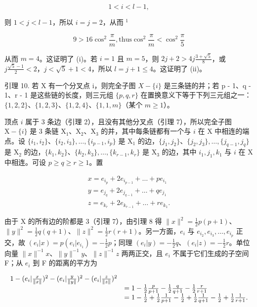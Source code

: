 \[
1 <   i <   l - 1,
\]

则 \(1 < j < l - 1\)，所以 \(i = j = 2\)，从而 \({}^1\)

\[
9 > 16 \cos^ {2} {\frac {\pi}{m}}, \text {thus} \cos^ {2} {\frac {\pi}{m}} <   \cos^ {2} {\frac {\pi}{5}}
\]

从而 \(m = 4\)。这证明了 (i)。若 \(i = 1\) 且 \(m = 5\)，则 \(2j + 2 > 4j\frac{3 + \sqrt{5}}{8}\)，或 \(j\frac{\sqrt{5} - 1}{2} < 2\)，\(j < \sqrt{5} + 1 < 4\)，所以 \(l = j + 1 \leqslant 4\)。这证明了 (ii)。

引理 10. 若 X 有一个分叉点 i，则完全子图 \(X - \{i\}\) 是三条链的并；若 p - 1、q - 1、r - 1 是这些链的长度，则三元组 \(\{p, q, r\}\) 在置换意义下等于下列三元组之一：\(\{1, 2, 2\}\)、\(\{1, 2, 3\}\)、\(\{1, 2, 4\}\)、\(\{1, 1, m\}\)（某个 \(m \geqslant 1\)）。

顶点 \(i\) 属于 3 条边（引理 2），且没有其他分叉点（引理 7），所以完全子图 \(\mathrm{X} - \{i\}\) 是 3 条链 \(\mathrm{X}_1\)、\(\mathrm{X}_2\)、\(\mathrm{X}_3\) 的并，其中每条链都有一个与 \(i\) 在 \(\mathrm{X}\) 中相连的端点。设 \(\{i_1, i_2\}\)、\(\{i_2, i_3\}, \ldots, \{i_{p-1}, i_p\}\) 是 \(\mathrm{X}_1\) 的边，\(\{j_1, j_2\}\)、\(\{j_2, j_3\}, \ldots, \{j_{q-1}, j_q\}\) 是 \(\mathrm{X}_2\) 的边，\(\{k_1, k_2\}\)、\(\{k_2, k_3\}, \ldots, \{k_{r-1}, k_r\}\) 是 \(\mathrm{X}_3\) 的边，其中 \(i_1, j_1, k_1\) 与 \(i\) 在 \(\mathrm{X}\) 中相连。可设 \(p \geqslant q \geqslant r \geqslant 1\)。置

\[
\begin{array}{l} x = e _ {i _ {p}} + 2 e _ {i _ {p - 1}} + \dots + p e _ {i _ {1}} \\ y = e _ {j _ {q}} + 2 e _ {j _ {q - 1}} + \dots + q e _ {j _ {1}} \\ z = e _ {k _ {r}} + 2 e _ {k _ {r - 1}} + \dots + r e _ {k _ {1}}. \end{array}
\]

由于 X 的所有边的阶都是 3（引理 7），由引理 8 得 \(\| x\|^2 = \frac{1}{2} p(p + 1)\)、\(\| y\|^2 = \frac{1}{2} q(q + 1)\)、\(\| z\|^2 = \frac{1}{2} r(r + 1)\)。另一方面，\(e_i\) 与 \(e_{i_2}, e_{i_3}, \ldots, e_{i_p}\) 正交，故 \((e_i|x) = p(e_i|e_{i_1}) = -\frac{1}{2} p\)；同理 \((e_i|y) = -\frac{1}{2} q\)、\((e_i|z) = -\frac{1}{2} r\)。单位向量 \(\| x\|^ {-1}x\)、\(\| y\|^ {-1}y\)、\(\| z\|^ {-1}z\) 两两正交，且 \(e_i\) 不属于它们生成的子空间 F；从 \(e_i\) 到 F 的距离的平方为

\[
\begin{array}{r l} 1 - (e _ {i} | \frac {x}{\| x \|}) ^ {2} - (e _ {i} | \frac {y}{\| y \|}) ^ {2} - (e _ {i} | \frac {z}{\| z \|}) ^ {2} \\ & = 1 - \frac {1}{2} \frac {p}{p + 1} - \frac {1}{2} \frac {q}{q + 1} - \frac {1}{2} \frac {r}{r + 1} \\ & = 1 - \frac {1}{2} + \frac {1}{2} \frac {1}{p + 1} - \frac {1}{2} + \frac {1}{2} \frac {1}{q + 1} - \frac {1}{2} + \frac {1}{2} \frac {1}{r + 1}. \end{array}
\]

